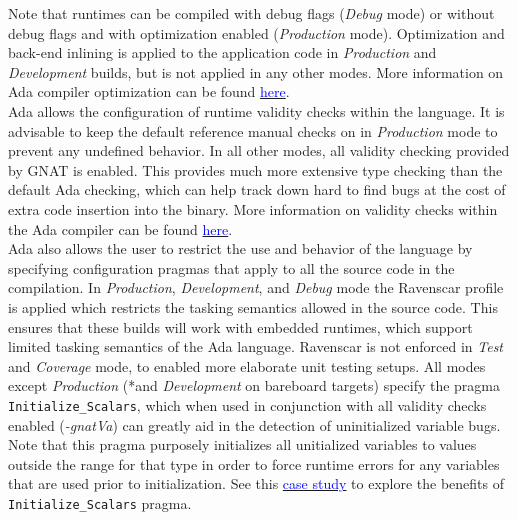 Note that runtimes can be compiled with debug flags (\textit{Debug} mode) or without debug flags and with optimization enabled (\textit{Production} mode). Optimization and back-end inlining is applied to the application code in \textit{Production} and \textit{Development} builds, but is not applied in any other modes. More information on Ada compiler optimization can be found \href{https://gcc.gnu.org/onlinedocs/gcc-4.6.2/gnat_ugn_unw/Switches-for-gcc.html}{\textcolor{blue}{here}}. \\

Ada allows the configuration of runtime validity checks within the language. It is advisable to keep the default reference manual checks on in \textit{Production} mode to prevent any undefined behavior. In all other modes, all validity checking provided by GNAT is enabled. This provides much more extensive type checking than the default Ada checking, which can help track down hard to find bugs at the cost of extra code insertion into the binary. More information on validity checks within the Ada compiler can be found \href{https://gcc.gnu.org/onlinedocs/gcc-4.6.2/gnat_ugn_unw/Validity-Checking.html#Validity-Checking}{\textcolor{blue}{here}}. \\

Ada also allows the user to restrict the use and behavior of the language by specifying configuration pragmas that apply to all the source code in the compilation. In \textit{Production}, \textit{Development}, and \textit{Debug} mode the Ravenscar profile is applied which restricts the tasking semantics allowed in the source code. This ensures that these builds will work with embedded runtimes, which support limited tasking semantics of the Ada language. Ravenscar is not enforced in \textit{Test} and \textit{Coverage} mode, to enabled more elaborate unit testing setups. All modes except \textit{Production} (*and \textit{Development} on bareboard targets) specify the pragma \texttt{Initialize\_Scalars}, which when used in conjunction with all validity checks enabled (\textit{-gnatVa}) can greatly aid in the detection of uninitialized variable bugs. Note that this pragma purposely initializes all unitialized variables to values outside the range for that type in order to force runtime errors for any variables that are used prior to initialization. See this \href{https://www.adacore.com/uploads/techPapers/rtchecks.pdf}{\textcolor{blue}{case study}} to explore the benefits of \texttt{Initialize\_Scalars} pragma. \\

